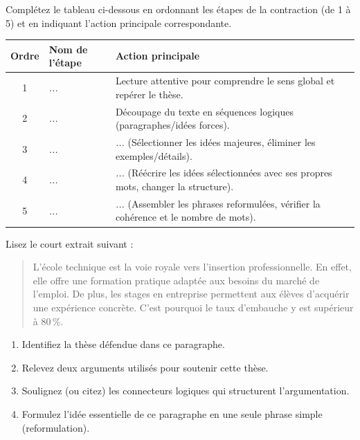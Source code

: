 \documentclass[11pt]{article}
\begin{document}
\begin{exercice}
Complétez le tableau ci-dessous en ordonnant les étapes de la contraction (de 1 à 5) et en indiquant l'action principale correspondante.

\begin{tabular}{|c|p{5cm}|p{6cm}|}
\hline
\textbf{Ordre} & \textbf{Nom de l'étape} & \textbf{Action principale} \\
\hline
1 & \textit{...} & Lecture attentive pour comprendre le sens global et repérer le thèse. \\
\hline
2 & \textit{...} & Découpage du texte en séquences logiques (paragraphes/idées forces). \\
\hline
3 & \textit{...} & \textit{...} (Sélectionner les idées majeures, éliminer les exemples/détails). \\
\hline
4 & \textit{...} & \textit{...} (Réécrire les idées sélectionnées avec ses propres mots, changer la structure). \\
\hline
5 & \textit{...} & \textit{...} (Assembler les phrases reformulées, vérifier la cohérence et le nombre de mots). \\
\hline
\end{tabular}
\end{exercice}

\begin{exercice}
Lisez le court extrait suivant :
\begin{quote}
\og L'école technique est la voie royale vers l'insertion professionnelle. En effet, elle offre une formation pratique adaptée aux besoins du marché de l'emploi. De plus, les stages en entreprise permettent aux élèves d'acquérir une expérience concrète. C'est pourquoi le taux d'embauche y est supérieur à 80\,\%. \fg
\end{quote}
\begin{enumerate}
    \item Identifiez la thèse défendue dans ce paragraphe.
    \item Relevez deux arguments utilisés pour soutenir cette thèse.
    \item Soulignez (ou citez) les connecteurs logiques qui structurent l'argumentation.
    \item Formulez l'idée essentielle de ce paragraphe en une seule phrase simple (reformulation).
\end{enumerate}
\end{exercice}
\end{document}
